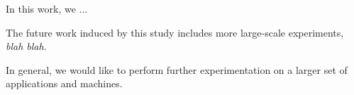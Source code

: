 

In this work, we ...


The future work induced by this study includes more large-scale experiments,
\emph{blah blah}. 

In general, we would like to perform further experimentation on a larger set of
applications and machines. 

%
